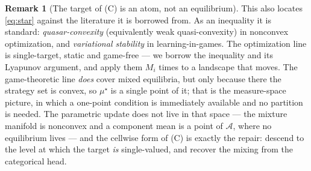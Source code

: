 \documentclass[11pt]{article}
\theoremstyle{definition}
\newtheorem{remark}{Remark}
\newcommand{\cA}{\mathcal{A}}
\begin{document}
\begin{remark}[The target of (C) is an atom, not an equilibrium]
This also locates \eqref{eq:star} against the literature it is borrowed from. As
an inequality it is standard: \emph{quasar-convexity} (equivalently weak
quasi-convexity) in nonconvex optimization, and \emph{variational stability} in
learning-in-games. The optimization line is single-target, static and
game-free --- we borrow the inequality and its Lyapunov argument, and apply them
$M_i$ times to a landscape that moves. The game-theoretic line \emph{does} cover
mixed equilibria, but only because there the strategy set is convex, so
$\mu^\star$ is a single point of it; that is the measure-space picture, in which
a one-point condition is immediately available and no partition is needed. The
parametric update does not live in that space --- the mixture manifold is
nonconvex and a component mean is a point of $\cA$, where no equilibrium
lives --- and the cellwise form of (C) is exactly the repair: descend to the level
at which the target \emph{is} single-valued, and recover the mixing from the
categorical head.
\end{remark}
\end{document}

